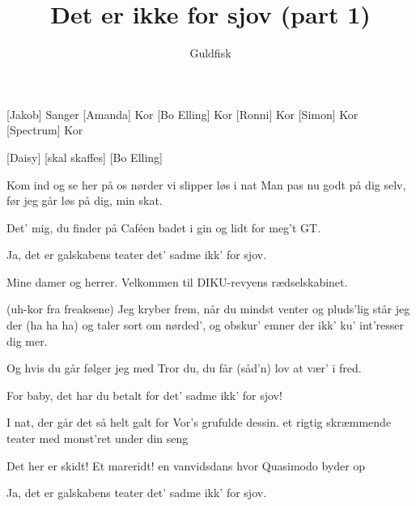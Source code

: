 \documentclass[a4paper,11pt]{article}
\title{Det er ikke for sjov (part 1)}
\author{Guldfisk}
\begin{document}
\maketitle

\begin{roles}
[Jakob] Sanger
[Amanda] Kor
[Bo Elling] Kor
[Ronni] Kor
[Simon] Kor
[Spectrum] Kor

\end{roles}

\begin{props}
[Daisy]
[skal skaffes]
[Bo Elling]
\end{props}
  
\begin{song}

 Kom ind og se her på os nørder
vi slipper løs i nat
Man pas nu godt på dig selv, før jeg
går løs på dig, min skat.

 Det' mig, du finder på Caféen
badet i gin
og lidt for meg't GT.

 Ja, det er galskabens teater
det' sadme ikk' for sjov.

 Mine damer og herrer. Velkommen til DIKU-revyens rædselskabinet.

 (uh-kor fra freaksene)
Jeg kryber frem, når du mindst venter
og pluds'lig står jeg der (ha ha ha)
og taler sort om nørded', og obskur' emner
der ikk' ku' int'resser dig mer.

 Og hvis du går
følger jeg med
Tror du, du får
(såd'n) lov at vær' i fred.

 For baby, det har du betalt for
det' sadme ikk' for sjov!

 I nat, der går det så helt galt for
Vor's grufulde dessin.
et rigtig skræmmende teater
med monst'ret under din seng

 Det her er skidt!
Et mareridt!
en vanvidsdans
hvor Quasimodo byder op

 Ja, det er galskabens teater
det' sadme ikk' for sjov.


\end{song}
\end{document}
